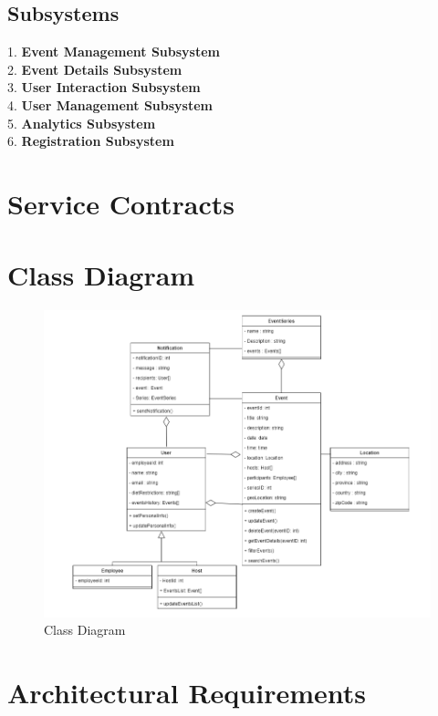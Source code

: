 \documentclass[a4paper,12pt]{article}
\begin{document}
\subsection{Subsystems}
1. \textbf{Event Management Subsystem}\\
2. \textbf{Event Details Subsystem}\\
3. \textbf{User Interaction Subsystem}\\
4. \textbf{User Management Subsystem}\\
5. \textbf{Analytics Subsystem}\\
6. \textbf{Registration Subsystem}

\section{Service Contracts}
\label{sec:service-contracts}

\section{Class Diagram}
\label{sec:class-diagram}
\begin{figure}[H]
    \centering
    \includegraphics[width=\textwidth]{EventsClassDiagram.png}
    \caption{Class Diagram}
    \label{fig:class-diagram}
\end{figure}

\section{Architectural Requirements}
\label{sec:architectural-requirements}
\end{document}
